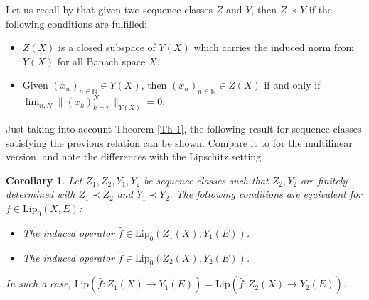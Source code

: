 \documentclass[12pt]{amsart}
\newtheorem{corollary}[theorem]{Corollary}
\def\N{\mathbb{N}}
\def\Lip{\mathrm{Lip}_0}
\def\Lipnorm{\mathrm{Lip}}
\begin{document}
Let us recall by \cite[Definition 2.5]{BotCam-17} that given two sequence classes $Z$ and $Y$, then $Z \prec Y$ if the following conditions are fulfilled:
\begin{itemize}
	\item[$(i)$] $Z(X)$ is a closed subspace of $Y(X)$ which carries the induced norm from $Y(X)$ for all Banach space $X$.
	\item[$(ii)$] Given $(x_n)_{n\in\N} \in Y(X)$, then $(x_n)_{n\in\N} \in Z(X)$ if and only if $\lim_{n,N}\|(x_k)_{k=n}^N\|_{Y(X)}=0$.
\end{itemize}

Just taking into account Theorem \ref{Th 1}, the following result for sequence classes satisfying the previous relation can be shown. Compare it to \cite[Corollary 2.6]{BotCam-17} for the multilinear version, and note the differences with the Lipschitz setting.

\begin{corollary}\label{Cor 2}
	Let $Z_1,Z_2,Y_1,Y_2$ be sequence classes such that $Z_2,Y_2$ are finitely determined with $Z_1 \prec Z_2$ and $Y_1 \prec Y_2$. The following conditions are equivalent for $f\in \Lip(X,E)$:
	\begin{itemize}
		\item[$(i)$] The induced operator $\hat{f} \in \Lip(Z_1(X),Y_1(E))$.
		\item[$(ii)$] The induced operator $\hat{f} \in \Lip(Z_2(X),Y_2(E))$.
	\end{itemize}
	In such a case, $\Lipnorm(\hat{f}:Z_1(X)\to Y_1(E)) = \Lipnorm(\hat{f}:Z_2(X)\to Y_2(E))$.
\end{corollary}
\end{document}
